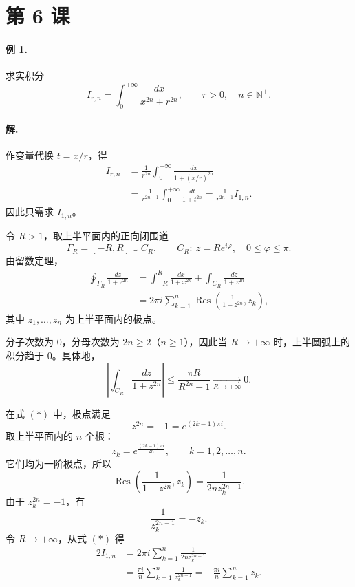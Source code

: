 \section*{第 6 课}

\paragraph{例 1.}
求实积分
\[
  I_{r,n}=\int_0^{+\infty}\frac{dx}{x^{2n}+r^{2n}},
  \qquad r>0,\quad n\in\mathbb{N}^{+}.
\]

\paragraph{解.}
作变量代换 $t=x/r$，得
\begin{align*}
  I_{r,n}
  &=\frac{1}{r^{2n}}\int_0^{+\infty}
    \frac{dx}{1+(x/r)^{2n}}\\
  &=\frac{1}{r^{2n-1}}\int_0^{+\infty}
    \frac{dt}{1+t^{2n}}
   =\frac{1}{r^{2n-1}}I_{1,n}.
\end{align*}
因此只需求 $I_{1,n}$。

令 $R>1$，取上半平面内的正向闭围道
\[
  \Gamma_R=[-R,R]\cup C_R,\qquad
  C_R:\ z=Re^{i\varphi},\quad 0\le\varphi\le\pi.
\]
由留数定理，
\begin{align*}
  \oint_{\Gamma_R}\frac{dz}{1+z^{2n}}
  &=\int_{-R}^{R}\frac{dx}{1+x^{2n}}
    +\int_{C_R}\frac{dz}{1+z^{2n}}\\
  &=2\pi i\sum_{k=1}^{n}
    \operatorname{Res}\left(\frac{1}{1+z^{2n}},z_k\right),
  \tag{*}
\end{align*}
其中 $z_1,\ldots,z_n$ 为上半平面内的极点。

分子次数为 $0$，分母次数为 $2n\ge2$（$n\ge1$），因此当
$R\to+\infty$ 时，上半圆弧上的积分趋于 $0$。具体地，
\[
  \left|\int_{C_R}\frac{dz}{1+z^{2n}}\right|
  \le\frac{\pi R}{R^{2n}-1}\xrightarrow[R\to+\infty]{}0.
\]

在式 $(*)$ 中，极点满足
\[
  z^{2n}=-1=e^{(2k-1)\pi i}.
\]
取上半平面内的 $n$ 个根：
\[
  z_k=e^{\frac{(2k-1)\pi i}{2n}},
  \qquad k=1,2,\ldots,n.
\]
它们均为一阶极点，所以
\[
  \operatorname{Res}\left(\frac{1}{1+z^{2n}},z_k\right)
  =\frac{1}{2n z_k^{2n-1}}.
\]
由于 $z_k^{2n}=-1$，有
\[
  \frac{1}{z_k^{2n-1}}=-z_k.
\]
令 $R\to+\infty$，从式 $(*)$ 得
\begin{align*}
  2I_{1,n}
  &=2\pi i\sum_{k=1}^{n}\frac{1}{2n z_k^{2n-1}}\\
  &=\frac{\pi i}{n}\sum_{k=1}^{n}\frac{1}{z_k^{2n-1}}
   =-\frac{\pi i}{n}\sum_{k=1}^{n}z_k.
\end{align*}

